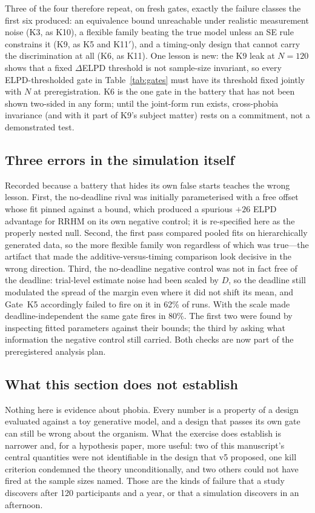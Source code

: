 \documentclass[9pt,twocolumn]{article}
\begin{document}
Three of the four therefore repeat, on fresh gates, exactly the failure classes the first six produced: an equivalence bound unreachable under realistic measurement noise (K3, as K10), a flexible family beating the true model unless an SE rule constrains it (K9, as K5 and K11$'$), and a timing-only design that cannot carry the discrimination at all (K6, as K11). One lesson is new: the K9 leak at $N=120$ shows that a fixed $\Delta$ELPD threshold is not sample-size invariant, so every ELPD-thresholded gate in Table~\ref{tab:gates} must have its threshold fixed jointly with $N$ at preregistration. K6 is the one gate in the battery that has not been shown two-sided in any form; until the joint-form run exists, cross-phobia invariance (and with it part of K9's subject matter) rests on a commitment, not a demonstrated test.

\subsection{Three errors in the simulation itself}
Recorded because a battery that hides its own false starts teaches the wrong lesson. First, the no-deadline rival was initially parameterised with a free offset whose fit pinned against a bound, which produced a spurious $+26$ ELPD advantage for RRHM on its own negative control; it is re-specified here as the properly nested null. Second, the first pass compared pooled fits on hierarchically generated data, so the more flexible family won regardless of which was true---the artifact that made the additive-versus-timing comparison look decisive in the wrong direction. Third, the no-deadline negative control was not in fact free of the deadline: trial-level estimate noise had been scaled by $D$, so the deadline still modulated the spread of the margin even where it did not shift its mean, and Gate~K5 accordingly failed to fire on it in 62\% of runs. With the scale made deadline-independent the same gate fires in 80\%. The first two were found by inspecting fitted parameters against their bounds; the third by asking what information the negative control still carried. Both checks are now part of the preregistered analysis plan.

\subsection{What this section does not establish}
Nothing here is evidence about phobia. Every number is a property of a design evaluated against a toy generative model, and a design that passes its own gate can still be wrong about the organism. What the exercise does establish is narrower and, for a hypothesis paper, more useful: two of this manuscript's central quantities were not identifiable in the design that v5 proposed, one kill criterion condemned the theory unconditionally, and two others could not have fired at the sample sizes named. Those are the kinds of failure that a study discovers after 120 participants and a year, or that a simulation discovers in an afternoon.
\end{document}
